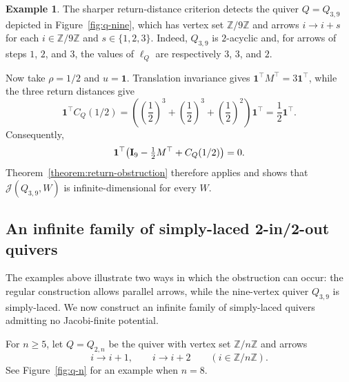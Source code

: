 \documentclass[11pt,letterpaper,reqno]{amsart}
\theoremstyle{definition}
\newtheorem{example}[example]{Example}
\newcommand{\one}{\mathbf 1}
\newcommand{\Jac}{\mathcal J}
\begin{document}
\begin{example}

The sharper return-distance criterion detects the quiver
$Q=Q_{3,9}$ depicted in Figure~\ref{fig:q-nine}, which has vertex set
$\mathbb Z/9\mathbb Z$ and arrows $i\longrightarrow i+s$ for each
$i\in\mathbb Z/9\mathbb Z$ and $s\in\{1,2,3\}$.
Indeed, $Q_{3,9}$ is $2$-acyclic and, for arrows of steps $1$, $2$,
and $3$, the values of $\ell_Q$ are respectively $3$, $3$, and $2$.

Now take $\rho=1/2$ and $u=\one$. Translation invariance gives $\one^{\top}M^{\top}=3\one^{\top}$, while the three return distances give
	\[
	\one^{\top}C_Q(1/2)
	=
	\left(
	\left(\frac12\right)^3
	+\left(\frac12\right)^3
	+\left(\frac12\right)^2
	\right)\one^{\top}
	=
	\frac12\one^{\top}.
	\]
	Consequently,
	\[
	\one^{\top}
	\bigl(
	{\bf I}_{9}-\tfrac12M^{\top}+C_Q(1/2)
	\bigr)
	=0.
	\]
	Theorem~\ref{theorem:return-obstruction} therefore applies and shows that
	$\Jac(Q_{3,9},W)$ is infinite-dimensional for every $W$.
\end{example}

\subsection{An infinite family of simply-laced 2-in/2-out quivers}

The examples above illustrate two ways in which the obstruction can occur:
the regular construction allows parallel arrows, while the nine-vertex
quiver $Q_{3,9}$ is simply-laced. We now construct an
infinite family of simply-laced quivers admitting no Jacobi-finite potential.

For $n\geq5$, let $Q=Q_{2,n}$ be the quiver with vertex set
$\mathbb Z/n\mathbb Z$ and arrows
\begin{equation*}
	i\longrightarrow i+1,
	\qquad
	i\longrightarrow i+2
	\qquad(i\in\mathbb Z/n\mathbb Z).
\end{equation*}
See Figure~\ref{fig:q-n} for an example when $n=8$.
\end{document}

